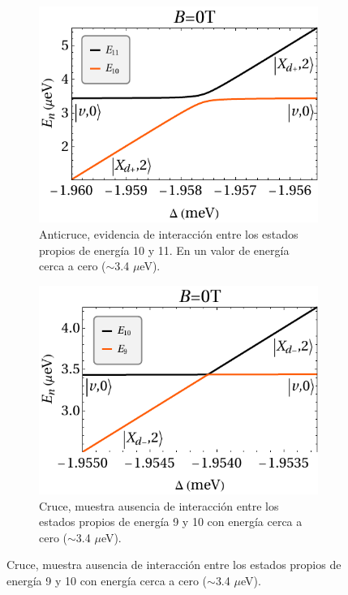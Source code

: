 \documentclass[main.tex]{subfiles}
\begin{document}
\begin{figure}[htbp]
	\centering
	\begin{subfigure}[b]{0.49\textwidth}
		\centering
		\includegraphics[width=\textwidth]{res/E11E10_B0}
		\caption{Anticruce, evidencia de interacción entre los estados propios de energía 10 y 11. En un valor de energ\'ia cerca a cero ($\sim$3.4 $\mu$eV).}
		\label{fig:E11E10_B0}
	\end{subfigure}
	\hfill
	\begin{subfigure}[b]{0.49\textwidth}
		\centering
		\includegraphics[width=\textwidth]{res/E10E9_B0}
		\caption{Cruce, muestra ausencia de interacción entre los estados propios de energía 9 y 10 con energ\'ia cerca a cero ($\sim$3.4 $\mu$eV).}

\end{subfigure}
\end{figure}
\end{document}
